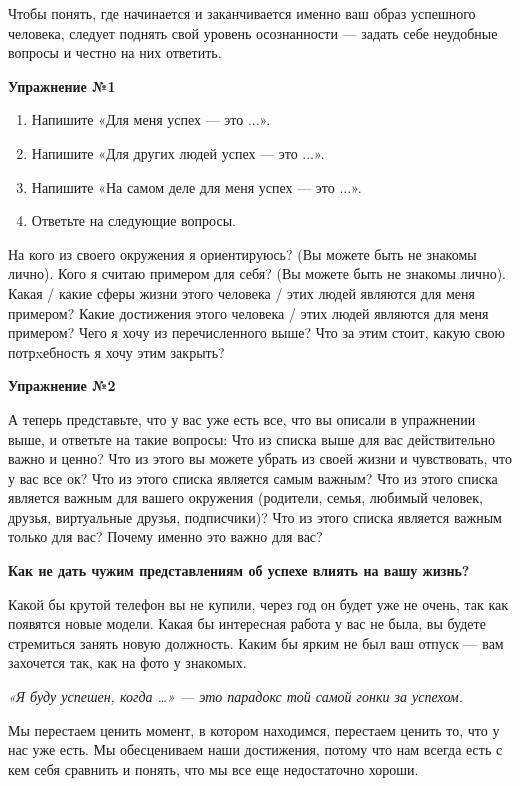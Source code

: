 Чтобы понять, где начинается и заканчивается именно ваш образ успешного человека, следует поднять свой уровень осознанности — задать себе неудобные вопросы и честно на них ответить.

\textbf{Упражнение №1}

\begin{enumerate}
    \item Напишите «Для меня успех — это ...».
    \item Напишите «Для других людей успех — это  ...».
    \item Напишите «На самом деле для меня успех — это ...».
    \item Ответьте на следующие вопросы.
\end{enumerate}

На кого из своего окружения я ориентируюсь? (Вы можете быть не знакомы лично). Кого я считаю примером для себя? (Вы можете быть не знакомы лично).
Какая / какие сферы жизни этого человека / этих людей являются для меня примером? Какие достижения этого человека / этих людей являются для меня примером? Чего я хочу из перечисленного выше?
Что за этим стоит, какую свою потрxебность я хочу этим закрыть?

\textbf{Упражнение №2}

А теперь представьте, что у вас уже есть все, что вы описали в упражнении выше, и ответьте на такие вопросы: Что из списка выше для вас действительно важно и ценно? Что из этого вы можете убрать из своей жизни и чувствовать, что у вас все ок? Что из этого списка является самым важным? Что из этого списка является важным для вашего окружения (родители, семья, любимый человек, друзья, виртуальные друзья, подписчики)? Что из этого списка является важным только для вас? Почему именно это важно для вас?

\textbf{Как не дать чужим представлениям об успехе влиять на вашу жизнь?}

Какой бы крутой телефон вы не купили, через год он будет уже не очень, так как появятся новые модели. Какая бы интересная работа у вас не была, вы будете стремиться занять новую должность. Каким бы ярким не был ваш отпуск — вам захочется так, как на фото у знакомых.

{\it
«Я буду успешен, когда …» — это парадокс той самой гонки за успехом.
}

Мы перестаем ценить момент, в котором находимся, перестаем ценить то, что у нас уже есть. Мы обесцениваем наши достижения, потому что нам всегда есть с кем себя сравнить и понять, что мы все еще недостаточно хороши.

